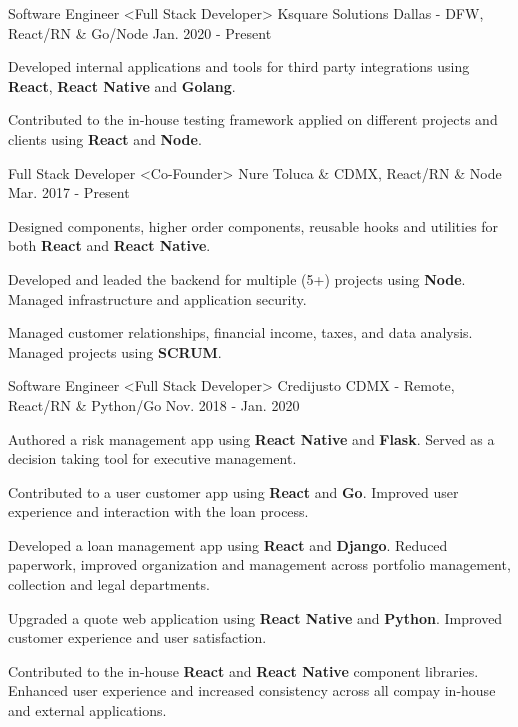 \begin{cventries}
  \cventry
    {Software Engineer <Full Stack Developer>}
    {Ksquare Solutions}
    {Dallas - DFW, React/RN \& Go/Node}
    {Jan. 2020 - Present}
    {
      \begin{cvitems}
        \item {Developed internal applications and tools for third party integrations using \textbf{React}, \textbf{React Native} and \textbf{Golang}.}
        \item {Contributed to the in-house testing framework applied on different projects and clients using \textbf{React} and \textbf{Node}.}
      \end{cvitems}
    }
  \cventry
    {Full Stack Developer <Co-Founder>}
    {Nure}
    {Toluca \& CDMX, React/RN \& Node}
    {Mar. 2017 - Present}
    {
      \begin{cvitems}
        \item {Designed components, higher order components, reusable hooks and utilities for both \textbf{React} and \textbf{React Native}.}
        \item {Developed and leaded the backend for multiple (5+) projects using \textbf{Node}. Managed infrastructure and application security.}
         \item {Managed customer relationships, financial income, taxes, and data analysis. Managed projects using \textbf{SCRUM}.}
      \end{cvitems}
    }
  \cventry
    {Software Engineer <Full Stack Developer>}
    {Credijusto}
    {CDMX - Remote, React/RN \& Python/Go}
    {Nov. 2018 - Jan. 2020}
    {
      \begin{cvitems}
        \item {Authored a risk management app using \textbf{React Native} and \textbf{Flask}. Served as a decision taking tool for executive management.}
        \item {Contributed to a user customer app using \textbf{React} and \textbf{Go}. Improved user experience and interaction with the loan process.}
        \item {Developed a loan management app using \textbf{React} and \textbf{Django}. Reduced paperwork, improved organization and management across portfolio management, collection and legal departments.}
        \item {Upgraded a quote web application using \textbf{React Native} and \textbf{Python}. Improved customer experience and user satisfaction.}
        \item {Contributed to the in-house \textbf{React} and \textbf{React Native} component libraries. Enhanced user experience and increased consistency across all compay in-house and external applications.}

\end{cvitems}}
\end{cventries}
